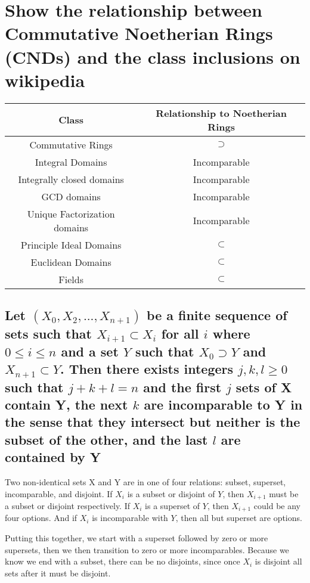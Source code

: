 \documentclass{article}
\begin{document}
\section{Show the relationship between Commutative Noetherian Rings (CNDs) and the class inclusions on wikipedia}

\begin{center}
\begin{tabular}{ |c|c| }
 \hline
 Class & Relationship to Noetherian Rings\\ 
 \hline
 Commutative Rings & $\supset$ \\ 
  Integral Domains & Incomparable  \\ 
  Integrally closed domains & Incomparable  \\ 
  GCD domains & Incomparable  \\ 
  Unique Factorization domains & Incomparable  \\ 
  Principle Ideal Domains & $\subset$  \\ 
  Euclidean Domains & $\subset$  \\ 
  Fields & $\subset$  \\ 
 \hline
\end{tabular}
\end{center}

\subsection{Let $(X_0, X_2, ..., X_{n+1})$ be a finite sequence of sets such that $X_{i+1} \subset X_i$ for all $i$ where $0 \le i \le n$ and a set $Y$ such that $X_0 \supset Y$ and $X_{n+1} \subset Y$. Then there exists integers $j, k, l \ge 0$ such that $j+k+l=n$ and the first $j$ sets of X contain Y, the next $k$ are incomparable to Y in the sense that they intersect but neither is the subset of the other, and the last $l$ are contained by Y}

Two non-identical sets X and Y are in one of four relations: subset, superset, incomparable, and disjoint. If $X_i$ is a subset or disjoint of $Y$, then $X_{i+1}$ must be a subset or disjoint respectively. If $X_i$ is a superset of $Y$, then $X_{i+1}$ could be any four options. And if $X_i$ is incomparable with $Y$, then all but superset are options.

Putting this together, we start with a superset followed by zero or more supersets, then we then transition to zero or more incomparables. Because we know we end with a subset, there can be no disjoints, since once $X_i$ is disjoint all sets after it must be disjoint.
\end{document}

